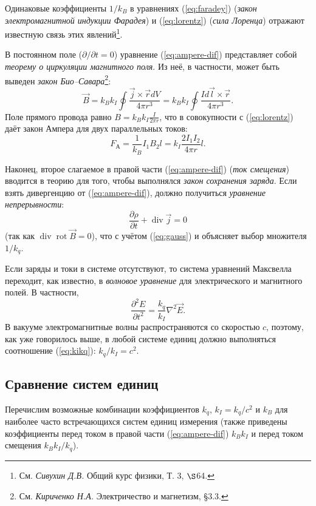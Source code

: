 Одинаковые коэффициенты $1/k_{B}$ в уравнениях (\ref{eq:faradey})
(\emph{закон электромагнитной индукции Фарадея}) и (\ref{eq:lorentz})
(\emph{сила Лоренца}) отражают известную связь этих явлений\footnote{См. \emph{Сивухин Д.В.} Общий курс физики, Т. 3, $\S$64.}.

В постоянном поле ($\partial/\partial t=0$) уравнение (\ref{eq:ampere-dif})
представляет собой \emph{теорему о циркуляции магнитного поля}. Из
неё, в частности, может быть выведен \emph{закон Био--Савара}\footnote{См. \emph{Кириченко Н.А.} Электричество и магнетизм, \S3.3.}:
\[
\vec{B}=k_{B}k_{I}\oint\frac{\vec{j}\times\vec{r}dV}{4\pi r^{3}}=k_{B}k_{I}\oint\frac{Id\vec{l}\times\vec{r}}{4\pi r^{3}}.
\]
Поле прямого провода равно $B=k_{B}k_{I}\frac{I}{2\pi r}$, что в
совокупности с (\ref{eq:lorentz}) даёт закон Ампера для двух параллельных
токов:
\[
F_{\text{А}}=\frac{1}{k_{B}}I_{1}B_{2}l=k_{I}\frac{2I_{1}I_{2}}{4\pi r}l.
\]

Наконец, второе слагаемое в правой части (\ref{eq:ampere-dif})
(\emph{ток смещения}) вводится в теорию для того, чтобы выполнялся
\emph{закон сохранения заряда}. Если взять дивергенцию от (\ref{eq:ampere-dif}),
должно получиться \emph{уравнение непрерывности}:
\[
\frac{\partial\rho}{\partial t}+\mathop{\mathrm{div}}\vec{j}=0
\]
(так как $\mathop{\mathrm{div}}\mathop{\mathrm{rot}}\vec{B}=0$),
что с учётом (\ref{eq:gauss}) и объясняет выбор множителя $1/k_{q}$.

Если заряды и токи в системе отсутствуют, то система уравнений Максвелла
переходит, как известно, в \emph{волновое уравнение} для электрического
и магнитного полей. В частности,
\[
\frac{\partial^{2}E}{\partial t^{2}}=\frac{k_{q}}{k_{I}}\nabla^{2}\vec{E}.
\]
В вакууме электромагнитные волны распространяются со скоростью $c$,
поэтому, как уже говорилось выше, в любой системе единиц должно выполняться
соотношение (\ref{eq:kikq}): $k_{q}/k_{I}=c^{2}$.

\subsection*{Сравнение систем единиц}

Перечислим возможные комбинации коэффициентов $k_{q}$, $k_{I}=k_{q}/c^{2}$
и $k_{B}$ для наиболее часто встречающихся систем единиц измерения
(также приведены коэффициенты перед током в правой части (\ref{eq:ampere-dif})
$k_{B}k_{I}$ и перед током смещения $k_{B}k_{I}/k_{q}$).

